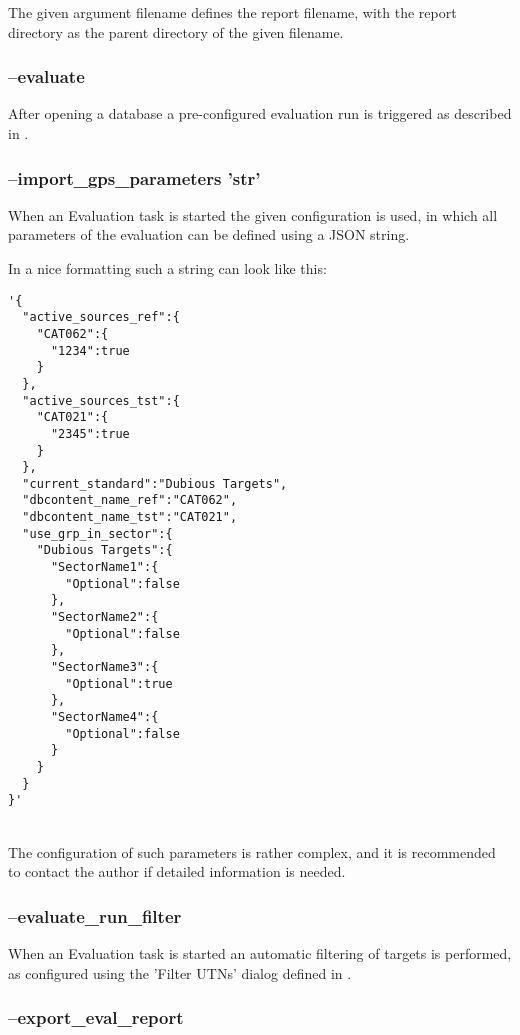 The given argument filename defines the report filename, with the report directory as the parent directory of the given filename.

\subsubsection{--evaluate}

After opening a database a pre-configured evaluation run is triggered as described in .

\subsubsection{--import\_gps\_parameters 'str'}

When an Evaluation task is started the given configuration is used, in which all parameters of the evaluation can be defined using a JSON string.

In a nice formatting such a string can look like this:
\begin{lstlisting}[basicstyle=\small\ttfamily]
'{
  "active_sources_ref":{
    "CAT062":{
      "1234":true
    }
  },
  "active_sources_tst":{
    "CAT021":{
      "2345":true
    }
  },
  "current_standard":"Dubious Targets",
  "dbcontent_name_ref":"CAT062",
  "dbcontent_name_tst":"CAT021",
  "use_grp_in_sector":{
    "Dubious Targets":{
      "SectorName1":{
        "Optional":false
      },
      "SectorName2":{
        "Optional":false
      },
      "SectorName3":{
        "Optional":true
      },
      "SectorName4":{
        "Optional":false
      }
    }
  }
}'
\end{lstlisting}
\ \\

The configuration of such parameters is rather complex, and it is recommended to contact the author if detailed information is needed.

\subsubsection{--evaluate\_run\_filter}

When an Evaluation task is started an automatic filtering of targets is performed, as configured using the 'Filter UTNs' dialog defined in .


\subsubsection{--export\_eval\_report}

